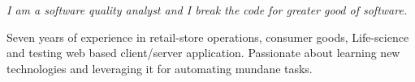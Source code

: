 \noindent \emph{I am a software quality analyst and I break the code for greater good of software.}

Seven years of experience in retail-store operations, consumer goods, Life-science and testing web based client/server application. Passionate about learning new technologies and leveraging it for automating mundane tasks. 

